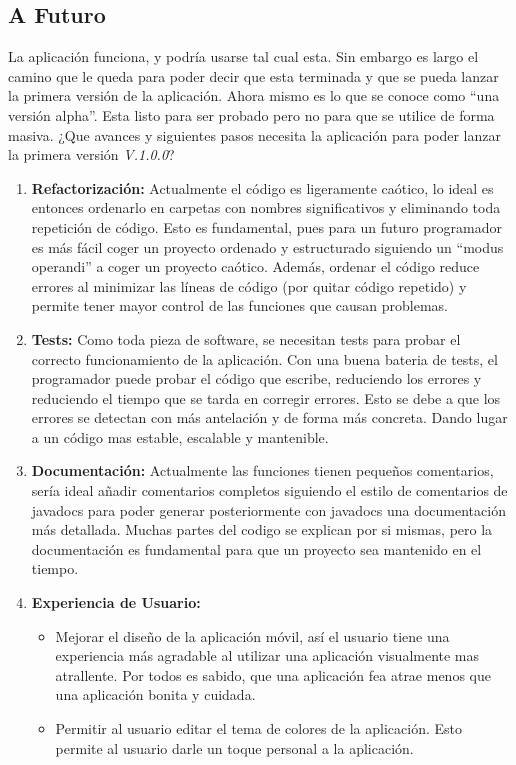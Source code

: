 \subsection{A Futuro}

La aplicación funciona, y podría usarse tal cual esta. Sin embargo es largo el camino que le queda para poder decir que esta terminada y que se pueda lanzar la primera versión de la aplicación. Ahora mismo es lo que se conoce como ``una versión alpha''. Esta listo para ser probado pero no para que se utilice de forma masiva. ¿Que avances y siguientes pasos necesita la aplicación para poder lanzar la primera versión \emph{V.1.0.0}?

\begin{enumerate}
\item \textbf{Refactorización: } Actualmente el código es ligeramente caótico, lo ideal es entonces ordenarlo en carpetas con nombres significativos y eliminando toda repetición de código. Esto es fundamental, pues para un futuro programador es más fácil coger un proyecto ordenado y estructurado siguiendo un ``modus operandi'' a coger un proyecto caótico. Además, ordenar el código reduce errores al minimizar las líneas de código (por quitar código repetido) y permite tener mayor control de las funciones que causan problemas. 

\item \textbf{Tests: } Como toda pieza de software, se necesitan tests para probar el correcto funcionamiento de la aplicación. Con una buena bateria de tests, el programador puede probar el código que escribe, reduciendo los errores y reduciendo el tiempo que se tarda en corregir errores. Esto se debe a que los errores se detectan con más antelación y de forma más concreta. Dando lugar a un código mas estable, escalable y mantenible. 

\item \textbf{Documentación: } Actualmente las funciones tienen pequeños comentarios, sería ideal añadir comentarios completos siguiendo el estilo de comentarios de javadocs para poder generar posteriormente con javadocs una documentación más detallada. Muchas partes del codigo se explican por si mismas, pero la documentación es fundamental para que un proyecto sea mantenido en el tiempo.

\item \textbf{Experiencia de Usuario: } 
  \begin{itemize}
  \item Mejorar el diseño de la aplicación móvil, así el usuario tiene una experiencia más agradable al utilizar una aplicación visualmente mas atrallente. Por todos es sabido, que una aplicación fea atrae menos que una aplicación bonita y cuidada. 
  \item Permitir al usuario editar el tema de colores de la aplicación. Esto permite al usuario darle un toque personal a la aplicación.
  \end{itemize}


\end{enumerate}

